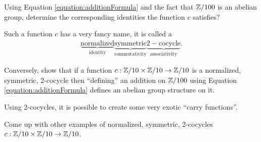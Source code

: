 \begin{qbox}
  Using Equation \eqref{equation:additionFormula} and the fact that $\mathbb{Z}/100$ is an abelian group, determine the corresponding identities the function $c$ satisfies?
\end{qbox}
Such a function $c$ has a very fancy name, it is called a
\begin{align*}
  \underbrace{\mathrm{normalized}}_{\mathrm{identity}}
  \underbrace{\mathrm{symmetric}}_{\mathrm{commutativity}}
  \underbrace{\mathrm{2-cocycle}}_{\mathrm{associativity}}.
\end{align*}

\begin{qbox}
  \label{q:cocycleDefinesGroup}
  Conversely, show that if a function $c: \mathbb{Z}/10 \times \mathbb{Z}/10 \rightarrow \mathbb{Z}/10$ is a normalized, symmetric, 2-cocycle then ``defining'' an addition on $\mathbb{Z}/100$ using Equation \ref{equation:additionFormula} defines an abelian group structure on it.
\end{qbox}


%

Using 2-cocycles, it is possible to create some very exotic ``carry functions''.
\begin{qbox}
  \label{q:symmetricCocycles}
  Come up with other examples of normalized, symmetric, 2-cocycles $c:\mathbb{Z}/10 \times \mathbb{Z}/10 \rightarrow \mathbb{Z}/10$.
\end{qbox}

